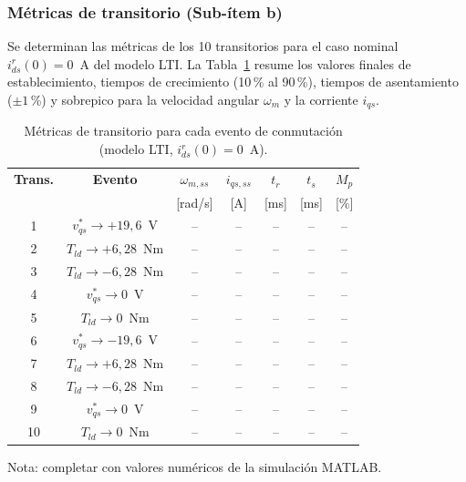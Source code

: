 \subsubsection{Métricas de transitorio (Sub-ítem b)}
\label{sec:sim_item_b}

Se determinan las métricas de los 10 transitorios para el caso nominal $i_{ds}^r(0) = 0$~A del modelo LTI. La Tabla~\ref{tab:metricas_trans} resume los valores finales de establecimiento, tiempos de crecimiento (10\,\% al 90\,\%), tiempos de asentamiento ($\pm 1$\,\%) y sobrepico para la velocidad angular $\omega_m$ y la corriente $i_{qs}$.

\begin{table}[H]
    \centering
    \caption{Métricas de transitorio para cada evento de conmutación (modelo LTI, $i_{ds}^r(0) = 0$~A).}
    \label{tab:metricas_trans}
    \renewcommand{\arraystretch}{1.15}
    \footnotesize
    \begin{tabular}{|c|c|c|c|c|c|c|}
        \hline
        \textbf{Trans.} & \textbf{Evento} & $\omega_{m,ss}$ & $i_{qs,ss}$ & $t_r$ & $t_s$ & $M_p$ \\
         & & [rad/s] & [A] & [ms] & [ms] & [\%] \\
        \hline
        1 & $v_{qs}^* \to +19{,}6$~V & -- & -- & -- & -- & -- \\
        2 & $T_{ld} \to +6{,}28$~Nm & -- & -- & -- & -- & -- \\
        3 & $T_{ld} \to -6{,}28$~Nm & -- & -- & -- & -- & -- \\
        4 & $v_{qs}^* \to 0$~V & -- & -- & -- & -- & -- \\
        5 & $T_{ld} \to 0$~Nm & -- & -- & -- & -- & -- \\
        6 & $v_{qs}^* \to -19{,}6$~V & -- & -- & -- & -- & -- \\
        7 & $T_{ld} \to +6{,}28$~Nm & -- & -- & -- & -- & -- \\
        8 & $T_{ld} \to -6{,}28$~Nm & -- & -- & -- & -- & -- \\
        9 & $v_{qs}^* \to 0$~V & -- & -- & -- & -- & -- \\
        10 & $T_{ld} \to 0$~Nm & -- & -- & -- & -- & -- \\
        \hline
    \end{tabular}

    \vspace{2mm}
    \scriptsize Nota: completar con valores numéricos de la simulación MATLAB.
\end{table}

